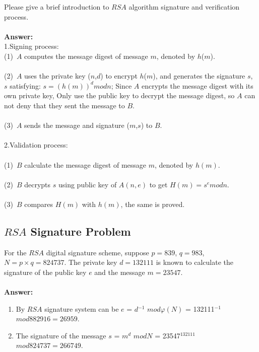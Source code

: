 \documentclass[paper=a4, fontsize=11pt]{scrartcl} %
\numberwithin{equation}{section} %
\numberwithin{figure}{section} %
\numberwithin{table}{section} %
\begin{document}
Please give a brief introduction to $RSA$ algorithm signature and verification process.
\\
\\
\textbf{Answer:}\\
\noindent 1.Signing process:\\
\hspace*{0.5cm}(1)\ $A$ computes the message digest of message $m$, denoted by $h$($m$).  \\
\\
\hspace*{0.5cm}(2)\ $A$ uses the private key ($n$,$d$) to encrypt $h$($m$), and generates the signature $s$, $s$ satisfying: $s = (h(m))^ d mod n$; Since $A$ encrypts the message digest with its own private key, Only use the public key to decrypt the message digest, so $A$ can not deny that they sent the message to $B$.  \\
\\
\hspace*{0.5cm}(3)\ $A$ sends the message and signature ($m$,$s$) to $B$.   \\
\\
\noindent 2.Validation process:\\
\\
\hspace*{0.5cm}(1)\ $B$ calculate the message digest of message $m$, denoted by $h(m)$.  \\
\\
\hspace*{0.5cm}(2)\ $B$ decrypts $s$ using public key of $A(n,e)$ to get $H(m) = s ^ e mod n$.  \\
\\
\hspace*{0.5cm}(3)\ $B$ compares $H(m)$ with $h(m)$, the same is proved.   \\


\subsection{$RSA$ Signature Problem \uppercase\expandafter{}}

For the $RSA$ digital signature scheme, suppose $p = 839$, $q = 983$, $N = p\times q = 824737$. The private key $d = 132111$ is known to calculate the signature of the public key $e$ and the message $m = 23547$.
\\
\\
\textbf{Answer:}
\begin{enumerate}
\item By $RSA$ signature system can be $e$ = $d$$^{-1}$ $mod \varphi(N)$ = 132111$^{-1}$ $mod 882916=26959$.
\item The signature of the message $s$ = $m^d$ $mod N$ = 23547$^{132111}$ $mod 824737=266749$.
\end{enumerate}
\end{document}
